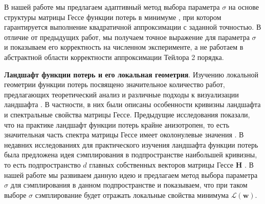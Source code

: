 \documentclass[11pt,a4paper]{article}
\begin{document}
В нашей работе мы предлагаем адаптивный метод выбора параметра $\sigma$ на основе структуры матрицы Гессе функции потерь в минимуме \cite{kiselev2024hessian}, при котором гарантируется выполнение квадратичной аппроксимации с заданной точностью. 
В отличие от предыдущих работ, мы получаем точное выражение для параметра $\sigma$ и показываем его корректность на численном эксперименте, а не работаем в абстрактной области корректности аппроксимации Тейлора 2 порядка.


\textbf{Ландшафт функции потерь и его локальная геометрия}. 
Изучению локальной геометрии функции потерь посвящено значительное количество работ, предлагающих теоретический анализ и различные подходы к визуализации ландшафта \cite{li2018visualizing, xu2024visualizing, FortGanguli2019Emergent}. В частности, в них были описаны особенности кривизны ландшафта и спектральные свойства матрицы Гессе\cite{sagun2017empirical, ghorbani2019investigation, wu2021dissecting}.
\newline
Предыдущие исследования показали, что на практике ландшафт функции потерь крайне анизотропен, то есть значительная часть спектра матрицы Гессе имеет околонулевые значения \cite{baskerville2021appearance, singh2023hessian, Papyan2020Traces}. В недавних исследованиях для практического изучения ландшафта функции потерь была предложена идея сэмплирования в подпространстве наибольшей кривизны, то есть подпространство $d$ главных собственных векторов матрицы Гессе $\mathbf{H}$ \cite{kiselev2025robust}. В нашей работе мы развиваем данную идею и предлагаем метод выбора параметра $\sigma$ для сэмплирования в данном подпространстве и показываем, что при таком выборе $\sigma$ сэмплирование будет отражать локальные свойства минимума $\mathcal{L}(\mathbf{w})$.
\end{document}
